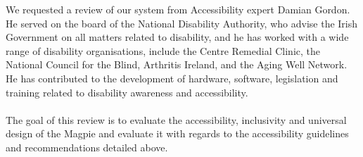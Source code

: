 We requested a review of our system from Accessibility expert Damian Gordon. He served on the board of the National Disability Authority, who advise the Irish Government on all matters related to disability, and he has worked with a wide range of disability organisations, include the Centre Remedial Clinic, the National Council for the Blind, Arthritis Ireland, and the Aging Well Network. He has contributed to the development of hardware, software, legislation and training related to disability awareness and accessibility. \\\\

The goal of this review is to evaluate the accessibility, inclusivity and universal design of the Magpie and evaluate it with regards to the accessibility guidelines and recommendations detailed above.\\\\

